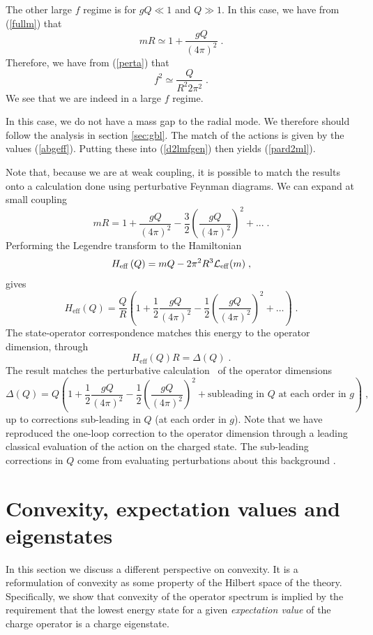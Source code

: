 \documentclass[11pt]{article}
\numberwithin{equation}{section}
\newcommand{\be}{\begin{equation}} \newcommand{\ee}{\end{equation}}
\begin{document}
The other large $f$ regime is for $gQ \ll 1$ and $Q \gg 1$. In this case, we have from (\ref{fullm}) that 
\be
m R \simeq 1 + \frac{g Q}{\left(4\pi\right)^2}\;.
\ee
Therefore, we have from (\ref{perta}) that
\be
f^2 \simeq \frac{Q}{R^2 2\pi^2} \;.
\ee
We see that we are indeed in a large $f$ regime. 

In this case, we do not have a mass gap to the radial mode. We therefore should follow the analysis in section \ref{sec:gbl}. The match of the actions is given by the values (\ref{abgeff}). Putting these into (\ref{d2lmfgen}) then yields (\ref{pard2ml}). 

   
    
  
 Note that, because we are at weak coupling, it is possible to match the results onto a calculation done using perturbative Feynman diagrams. 
 We can expand at small coupling
 \be
 m R = 1+ \frac{g Q}{\left(4\pi\right)^2} - \frac32 \left(\frac{g Q}{\left(4\pi\right)^2}\right)^2 + ... \;.
 \label{pertm}
 \ee
 Performing the Legendre transform to the Hamiltonian
 \be
 H_{\mathrm{eff}}\left(Q\right) = m Q - 2 \pi^2 R^3 {\cal L}_{\mathrm{eff}}(m) \;,
 \label{legtramex}
 \ee
 gives
 \be
 H_{\mathrm{eff}}\left(Q\right) = \frac{Q}{R} \left( 1 + \frac12 \frac{gQ}{(4\pi)^2} - \frac12 \left( \frac{gQ}{(4\pi)^2} \right)^2 + \dots \right)\;. 
 \ee
 The state-operator correspondence matches this energy to the operator dimension, through
 \be
  H_{\mathrm{eff}}\left(Q\right) R = \Delta(Q) \;. 
 \ee
 The result matches the perturbative calculation~\cite{Badel:2019oxl,Arias-Tamargo:2019xld} of the operator dimensions
 \be
 \Delta(Q) = Q \left(1 + \frac12 \frac{gQ}{(4\pi)^2} - \frac12\left(\frac{gQ}{(4\pi)^2}\right)^2  + \text{subleading in \(Q\) at each order in \(g\)} \right) \;,
 \ee
 up to corrections sub-leading in $Q$ (at each order in $g$). Note that we have reproduced the one-loop correction to the operator dimension through a leading classical evaluation of the action on the charged state. The sub-leading corrections in $Q$ come from evaluating perturbations about this background \cite{Badel:2019oxl,Antipin:2020abu}.



\section{Convexity, expectation values and eigenstates}
\label{sec:cce}
	
In this section we discuss a different perspective on convexity. It is a reformulation of convexity as some property of the Hilbert space of the theory. Specifically, we show that convexity of the operator spectrum is implied by the requirement that the lowest energy state for a given {\it expectation value} of the charge operator is a charge eigenstate. 
\end{document}
